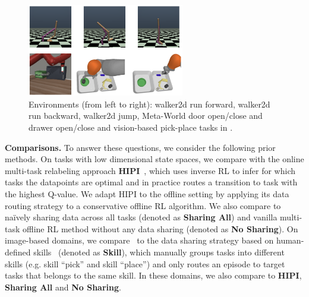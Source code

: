 \begin{figure}
    \vspace{-0.65cm}
    \centering
    \includegraphics[width=0.61\textwidth]{chapters/cds/env.png}
    \vspace{-0.32cm}
    \caption{\footnotesize  Environments (from left to right): walker2d {run forward}, walker2d {run backward}, walker2d {jump},  Meta-World {door open/close} and {drawer open/close} and vision-based pick-place tasks in \citep{kalashnikov2021mt}.}
    \label{fig:env}
    \vspace{-0.4cm}
\end{figure}
\textbf{Comparisons.} To answer these questions, we consider the following prior methods. On tasks with low dimensional state spaces, we compare with the online multi-task relabeling approach \textbf{HIPI}~\citep{eysenbach2020rewriting}, which uses inverse RL to infer for which tasks the datapoints are optimal and in practice routes a transition to task with the highest Q-value. We adapt HIPI to the offline setting by applying its data routing strategy to a conservative offline RL algorithm.
We also compare to na\"ively sharing data across all tasks (denoted as \textbf{Sharing All}) and vanilla multi-task offline RL method without any data sharing (denoted as \textbf{No Sharing}). On image-based domains, we compare \cdsmethodname\ to the data sharing strategy based on human-defined skills~\citep{kalashnikov2021mt} (denoted as \textbf{Skill}), which manually groups tasks into different skills (e.g. skill ``pick'' and skill ``place'') and only routes an episode to target tasks that belongs to the same skill.
In these domains, we also compare to \textbf{HIPI}, \textbf{Sharing All} and \textbf{No Sharing}.  
